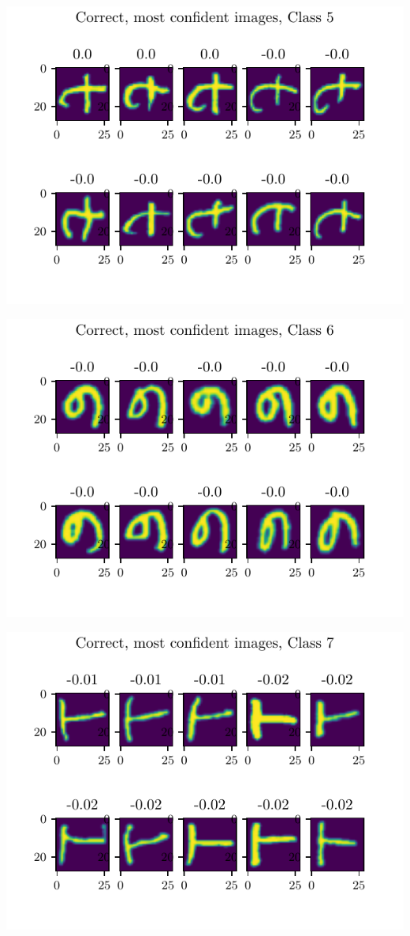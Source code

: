 \documentclass[11pt]{article}
\begin{document}
\includegraphics{figures/2d_confident_imgs_class_5.pdf}

\includegraphics{figures/2d_confident_imgs_class_6.pdf}

\includegraphics{figures/2d_confident_imgs_class_7.pdf}
\end{document}
